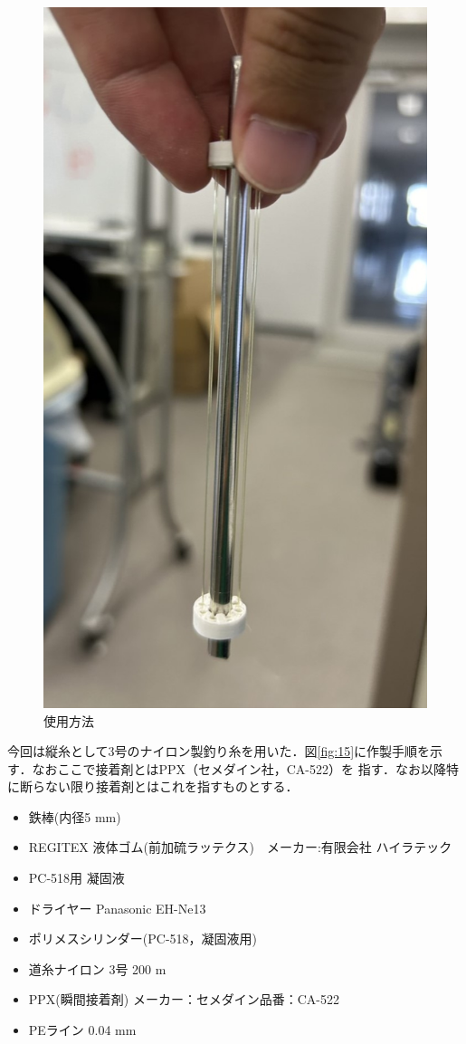 \begin{figure}[!h]
  \centering  %
  \includegraphics[scale=0.3]{pic/tukau.jpg}
  \caption{使用方法}
  \label{fig:14}
\end{figure}
\newpage
今回は縦糸として3号のナイロン製釣り糸を用いた．図\ref{fig:15}に作製手順を示す．なおここで接着剤とはPPX（セメダイン社，CA-522）を
指す．なお以降特に断らない限り接着剤とはこれを指すものとする．
\begin{itemize}
  \item 鉄棒(内径5 mm)
  \item REGITEX 液体ゴム(前加硫ラッテクス)　メーカー:有限会社 ハイラテック
  \item PC-518用 凝固液
  \item ドライヤー Panasonic EH-Ne13
  \item ポリメスシリンダー(PC-518，凝固液用)
  \item 道糸ナイロン 3号 200 m
  \item PPX(瞬間接着剤) メーカー：セメダイン品番：CA-522
  \item PEライン 0.04 mm
\end{itemize}
